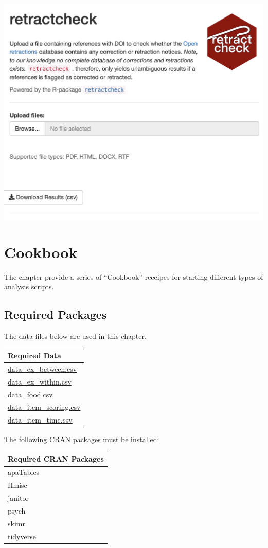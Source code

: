 \documentclass[
]{krantz}
\begin{document}
\includegraphics[width=0.6\linewidth]{ch_tools/images/retractcheck_website}

\hypertarget{cookbook}{%
\chapter{Cookbook}\label{cookbook}}

The chapter provide a series of ``Cookbook'' receipes for starting different types of analysis scripts.

\hypertarget{required-packages-1}{%
\section{Required Packages}\label{required-packages-1}}

The data files below are used in this chapter.

\begin{longtable}[]{@{}l@{}}
\toprule
Required Data \\
\midrule
\endhead
\url{data_ex_between.csv} \\
\url{data_ex_within.csv} \\
\url{data_food.csv} \\
\url{data_item_scoring.csv} \\
\url{data_item_time.csv} \\
\bottomrule
\end{longtable}

The following CRAN packages must be installed:

\begin{longtable}[]{@{}l@{}}
\toprule
Required CRAN Packages \\
\midrule
\endhead
apaTables \\
Hmisc \\
janitor \\
psych \\
skimr \\
tidyverse \\
\bottomrule
\end{longtable}
\end{document}
